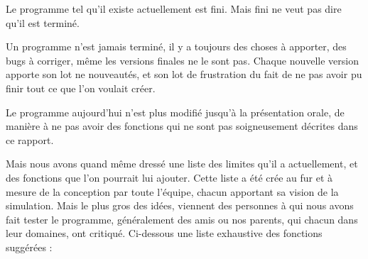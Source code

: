 Le programme tel qu'il existe actuellement est fini. Mais fini ne veut pas dire qu'il est terminé.

Un programme n'est jamais terminé, il y a toujours des choses à apporter, des bugs à corriger, même les versions finales ne le sont pas. Chaque nouvelle version apporte son lot ne nouveautés, et son lot de frustration du fait de ne pas avoir pu finir tout ce que l'on voulait créer.

Le programme aujourd'hui n'est plus modifié jusqu'à la présentation orale, de manière à ne pas avoir des fonctions qui ne sont pas soigneusement décrites dans ce rapport.

Mais nous avons quand même dressé une liste des limites qu'il a actuellement, et des fonctions que l'on pourrait lui ajouter. Cette liste a été crée au fur et à mesure de la conception par toute l'équipe, chacun apportant sa vision de la simulation. Mais le plus gros des idées, viennent des personnes à qui nous avons fait tester le programme, généralement des amis ou nos parents, qui chacun dans leur domaines, ont critiqué. Ci-dessous une liste exhaustive des fonctions suggérées : 

